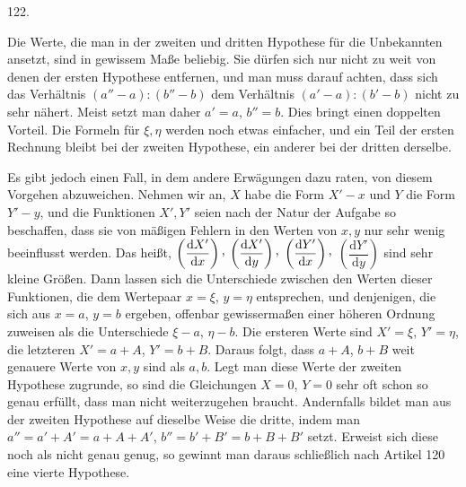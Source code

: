 \par{}\medskip
\begin{center}\hypertarget{native-169-article122}{}122.\end{center}
Die Werte, die man in der zweiten und dritten Hypothese für die Unbekannten ansetzt, sind in gewissem Maße beliebig. Sie dürfen sich nur nicht zu weit von denen der ersten Hypothese entfernen, und man muss darauf achten, dass sich das Verhältnis $(a''-a):(b''-b)$ dem Verhältnis $(a'-a):(b'-b)$ nicht zu sehr nähert. Meist setzt man daher $a'=a$, $b''=b$. Dies bringt einen doppelten Vorteil. Die Formeln für $\xi,\eta$ werden noch etwas einfacher, und ein Teil der ersten Rechnung bleibt bei der zweiten Hypothese, ein anderer bei der dritten derselbe.

Es gibt jedoch einen Fall, in dem andere Erwägungen dazu raten, von diesem Vorgehen abzuweichen. Nehmen wir an, $X$ habe die Form $X'-x$ und $Y$ die Form $Y'-y$, und die Funktionen $X',Y'$ seien nach der Natur der Aufgabe so beschaffen, dass sie von mäßigen Fehlern in den Werten von $x,y$ nur sehr wenig beeinflusst werden. Das heißt, $\left(\dfrac{\mathrm{d}X'}{\mathrm{d}x}\right)\mathpunct{\raisebox{.45ex}{,}}$ $\left(\dfrac{\mathrm{d}X'}{\mathrm{d}y}\right)\mathpunct{\raisebox{.45ex}{,}}$ $\left(\dfrac{\mathrm{d}Y'}{\mathrm{d}x}\right)\mathpunct{\raisebox{.45ex}{,}}$ $\left(\dfrac{\mathrm{d}Y'}{\mathrm{d}y}\right)$ sind sehr kleine Größen. Dann lassen sich die Unterschiede zwischen den Werten dieser Funktionen, die dem Wertepaar $x=\xi$, $y=\eta$ entsprechen, und denjenigen, die sich aus $x=a$, $y=b$ ergeben, offenbar gewissermaßen einer höheren Ordnung zuweisen als die Unterschiede $\xi-a$, $\eta-b$. Die ersteren Werte sind $X'=\xi$, $Y'=\eta$, die letzteren $X'=a+A$, $Y'=b+B$. Daraus folgt, dass $a+A$, $b+B$ weit genauere Werte von $x,y$ sind als $a,b$. Legt man diese Werte der zweiten Hypothese zugrunde, so sind die Gleichungen $X=0$, $Y=0$ sehr oft schon so genau erfüllt, dass man nicht weiterzugehen braucht. Andernfalls bildet man aus der zweiten Hypothese auf dieselbe Weise die dritte, indem man $a''=a'+A'=a+A+A'$, $b''=b'+B'=b+B+B'$ setzt. Erweist sich diese noch als nicht genau genug, so gewinnt man daraus schließlich nach Artikel 120 eine vierte Hypothese.
